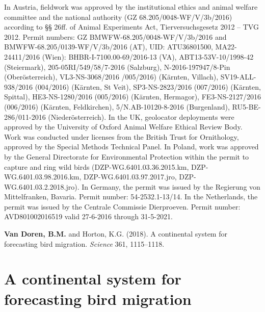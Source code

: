 \documentclass[a4paper, nobind]{templates/ociamthesis}
\begin{document}
In Austria, fieldwork was approved by the institutional ethics and animal welfare committee and the national authority (GZ 68.205/0048-WF/V/3b/2016) according to §§ 26ff. of Animal Experiments Act, Tierversuchsgesetz 2012 -- TVG 2012. Permit numbers: GZ BMWFW-68.205/0048-WF/V/3b/2016 and BMWFW-68.205/0139-WF/V/3b/2016 (AT), UID: ATU36801500, MA22-24411/2016 (Wien): BHBR-I-7100.00-69/2016-13 (VA), ABT13-53V-10/1998-42 (Steiermark), 205-05RI/549/58/7-2016 (Salzburg), N-2016-197947/8-Pin (Oberösterreich), VL3-NS-3068/2016 /005/2016) (Kärnten, Villach), SV19-ALL-938/2016 (004/2016) (Kärnten, St Veit), SP3-NS-2823/2016 (007/2016) (Kärnten, Spittal), HE3-NS-1280/2016 (005/2016) (Kärnten, Hermagor), FE3-NS-2127/2016 (006/2016) (Kärnten, Feldkirchen), 5/N.AB-10120-8-2016 (Burgenland), RU5-BE-286/011-2016 (Niederösterreich). In the UK, geolocator deployments were approved by the University of Oxford Animal Welfare Ethical Review Body. Work was conducted under licenses from the British Trust for Ornithology, approved by the Special Methods Technical Panel. In Poland, work was approved by the General Directorate for Environmental Protection within the permit to capture and ring wild birds (DZP-WG.6401.03.36.2015.km, DZP-WG.6401.03.98.2016.km, DZP-WG.6401.03.97.2017.jro, DZP-WG.6401.03.2.2018.jro). In Germany, the permit was issued by the Regierung von Mittelfranken, Bavaria. Permit number: 54-2532.1-13/14. In the Netherlands, the permit was issued by the Centrale Commissie Dierproeven. Permit number: AVD801002016519 valid 27-6-2016 through 31-5-2021.

\clearpage \printbibliography[segment=  herefsection,heading=subbibliography]

\begin{savequote}
\textbf{Van Doren, B.M.} and Horton, K.G. (2018). A continental system
for forecasting bird migration. \emph{Science} 361, 1115--1118.
\end{savequote}

\hypertarget{forecast}{
\chapter[A continental system for forecasting bird migration]{A continental system for\\forecasting bird migration}\label{forecast}}

\newpage

\begin{center}  \end{center} \newpage 
 \begin{center}  \end{center} \newpage 
 \begin{center}  \end{center} \newpage
\end{document}
